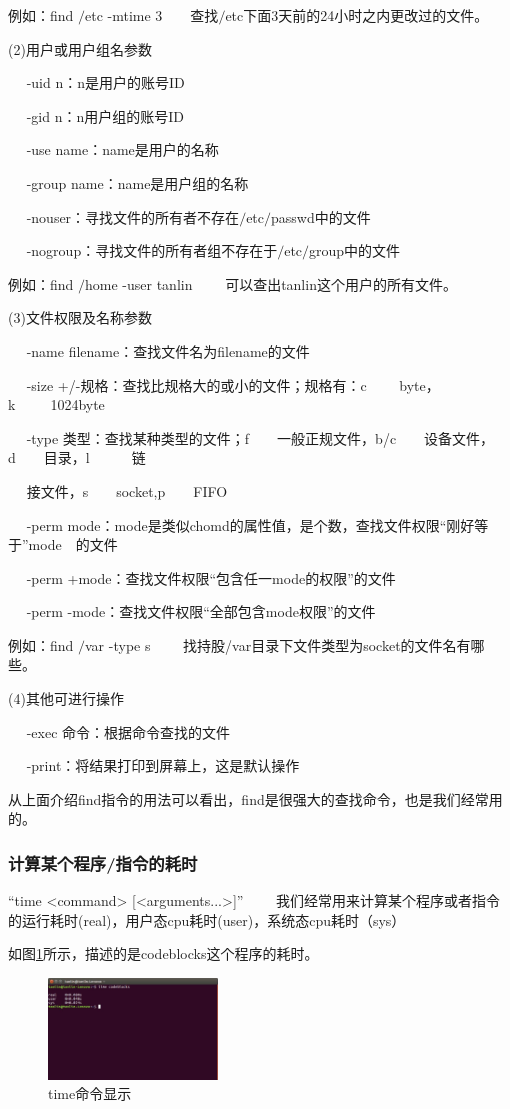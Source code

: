 \documentclass{article}
\begin{document}
例如：find $\slash$etc -mtime 3~~~~查找$\slash$etc下面3天前的24小时之内更改过的文件。

(2)用户或用户组名参数

~~ -uid n：n是用户的账号ID

~~ -gid n：n用户组的账号ID

~~ -use name：name是用户的名称

~~ -group name：name是用户组的名称

~~ -nouser：寻找文件的所有者不存在$\slash$etc$\slash$passwd中的文件

~~ -nogroup：寻找文件的所有者组不存在于$\slash$etc$\slash$group中的文件

例如：find $\slash$home -user tanlin ~~~~可以查出tanlin这个用户的所有文件。

(3)文件权限及名称参数

~~ -name filename：查找文件名为filename的文件

~~ -size +/-规格：查找比规格大的或小的文件；规格有：c ~~~~byte，k~~~~~1024byte

~~ -type 类型：查找某种类型的文件；f~~~~一般正规文件，b/c~~~~设备文件，d~~~~目录，l~~~~~~链

~~ 接文件，s~~~~socket,p~~~~FIFO

~~ -perm mode：mode是类似chomd的属性值，是个数，查找文件权限“刚好等于”mode~~的文件

~~ -perm +mode：查找文件权限“包含任一mode的权限”的文件

~~ -perm -mode：查找文件权限“全部包含mode权限”的文件

例如：find $\slash$var -type s  ~~~~找持股/var目录下文件类型为socket的文件名有哪些。

(4)其他可进行操作

~~ -exec 命令：根据命令查找的文件

~~ -print：将结果打印到屏幕上，这是默认操作

从上面介绍find指令的用法可以看出，find是很强大的查找命令，也是我们经常用的。
\subsubsection{计算某个程序/指令的耗时}
“time <command> [<arguments...>]” ~~~~我们经常用来计算某个程序或者指令的运行耗时(real)，用户态cpu耗时(user)，系统态cpu耗时（sys）

如图\ref{tu35}所示，描述的是codeblocks这个程序的耗时。
\begin{figure}[!htb] %
\centering
\includegraphics[width=0.4\textwidth]{tu35.jpeg}
\caption{\small time命令显示}
\label{tu35}
\end{figure} 
\end{document}
